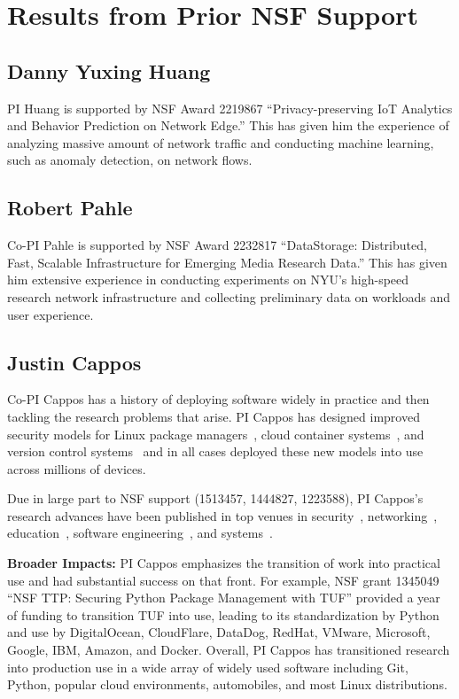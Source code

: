 \section{Results from Prior NSF Support}

\subsection*{Danny Yuxing Huang}
PI Huang is supported by NSF Award 2219867 ``Privacy-preserving IoT Analytics and Behavior Prediction on Network Edge.'' This has given him the experience of analyzing massive amount of network traffic and conducting machine learning, such as anomaly detection, on network flows.


\subsection*{Robert Pahle}
Co-PI Pahle is supported by NSF Award 2232817 ``DataStorage: Distributed, Fast, Scalable Infrastructure for Emerging Media Research Data.'' This has given him extensive experience in conducting experiments on NYU's high-speed research network infrastructure and collecting preliminary data on workloads and user experience.



\subsection*{Justin Cappos}
Co-PI Cappos has a history of deploying software widely in practice and then
tackling the research problems that arise. PI Cappos has designed improved
security models for Linux package managers~\cite{Cappos_CCS_2008}, cloud
container systems~\cite{Kuppusamy_NSDI_2016, Kuppusamy_USENIX_2017}, and
version control systems~\cite{Torres_USENIXSec_2016} and in all cases
deployed these new models into use across millions of devices.

Due in large part to NSF support (1513457, 1444827, 1223588), PI Cappos's
research advances have been published in top venues in
security~\cite{Cappos_CCS_2010, Samuel_CCS_2010, Torres_USENIXSec_2016, Nikitin_USENIXSec_2017, in-toto-paper},
networking~\cite{Zhuang_NSDI_2014, Kuppusamy_NSDI_2016},
education~\cite{Cappos_SIGCSE_2009, Cappos_SIGCSE_2014, Hooshangi_SIGCSE_2015},
software engineering~\cite{Rasley_ISSRE_2015, Oliveira_ACSAC_2014,
Gopstein_FSE_2017},
and systems~\cite{Li_USENIX_2015, Li_USENIX_2017, Kuppusamy_USENIX_2017}.

\textbf{Broader Impacts:} PI Cappos emphasizes the transition of work into practical use and had
substantial success on that front.  For example, NSF
grant 1345049 ``NSF TTP: Securing Python Package Management with TUF''
provided a year of funding to transition TUF into use, leading to its
standardization by Python and use by
DigitalOcean, CloudFlare, DataDog, RedHat, VMware, Microsoft, Google,
IBM, Amazon, and Docker.
Overall, PI Cappos has
transitioned research into production use in a wide array of widely used
software including Git, Python, popular cloud environments, automobiles,
and most Linux distributions.

